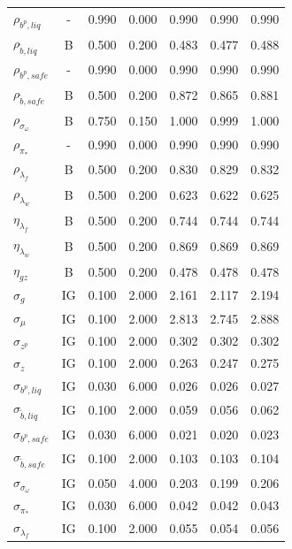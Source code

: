 \documentclass[12pt]{article}
\begin{document}
{\begin{longtable}{lcccccc}
$\rho_{b^p,liq}$ & - &    0.990 &    0.000 &    0.990 &    0.990 &    0.990 \\
$\rho_{\tilde{b},liq}$ & B &    0.500 &    0.200 &    0.483 &    0.477 &    0.488 \\
$\rho_{b^p,safe}$ & - &    0.990 &    0.000 &    0.990 &    0.990 &    0.990 \\
$\rho_{\tilde{b},safe}$ & B &    0.500 &    0.200 &    0.872 &    0.865 &    0.881 \\
$\rho_{\sigma_\omega}$ & B &    0.750 &    0.150 &    1.000 &    0.999 &    1.000 \\
$\rho_{\pi_*}$ & - &    0.990 &    0.000 &    0.990 &    0.990 &    0.990 \\
$\rho_{\lambda_f}$ & B &    0.500 &    0.200 &    0.830 &    0.829 &    0.832 \\
$\rho_{\lambda_w}$ & B &    0.500 &    0.200 &    0.623 &    0.622 &    0.625 \\
$\eta_{\lambda_f}$ & B &    0.500 &    0.200 &    0.744 &    0.744 &    0.744 \\
$\eta_{\lambda_w}$ & B &    0.500 &    0.200 &    0.869 &    0.869 &    0.869 \\
$\eta_{gz}$ & B &    0.500 &    0.200 &    0.478 &    0.478 &    0.478 \\
$\sigma_{g}$ & IG &    0.100 &    2.000 &    2.161 &    2.117 &    2.194 \\
$\sigma_{\mu}$ & IG &    0.100 &    2.000 &    2.813 &    2.745 &    2.888 \\
$\sigma_{z^p}$ & IG &    0.100 &    2.000 &    0.302 &    0.302 &    0.302 \\
$\sigma_{z}$ & IG &    0.100 &    2.000 &    0.263 &    0.247 &    0.275 \\
$\sigma_{b^p, liq}$ & IG &    0.030 &    6.000 &    0.026 &    0.026 &    0.027 \\
$\sigma_{\tilde{b}, liq}$ & IG &    0.100 &    2.000 &    0.059 &    0.056 &    0.062 \\
$\sigma_{b^p, safe}$ & IG &    0.030 &    6.000 &    0.021 &    0.020 &    0.023 \\
$\sigma_{\tilde{b}, safe}$ & IG &    0.100 &    2.000 &    0.103 &    0.103 &    0.104 \\
$\sigma_{\sigma_\omega}$ & IG &    0.050 &    4.000 &    0.203 &    0.199 &    0.206 \\
$\sigma_{\pi_*}$ & IG &    0.030 &    6.000 &    0.042 &    0.042 &    0.043 \\
$\sigma_{\lambda_f}$ & IG &    0.100 &    2.000 &    0.055 &    0.054 &    0.056 \\

\end{longtable}}
\end{document}
